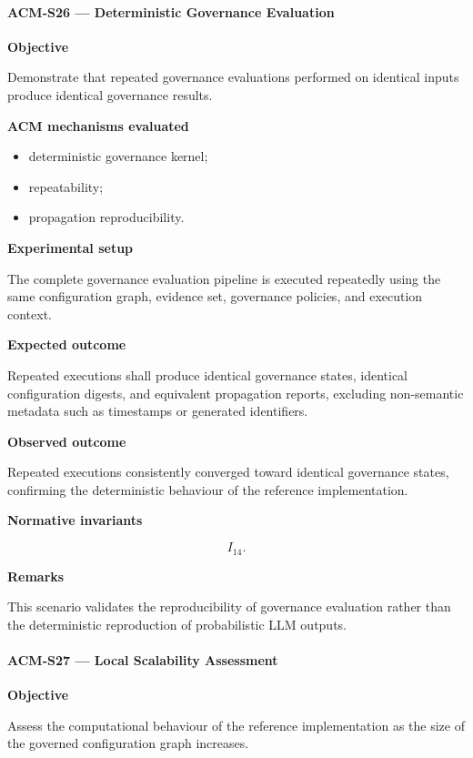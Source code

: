 \documentclass[10pt]{article}
\begin{document}
\paragraph{ACM-S26 --- Deterministic Governance Evaluation}

\textbf{Objective}

Demonstrate that repeated governance evaluations performed on identical inputs
produce identical governance results.

\textbf{ACM mechanisms evaluated}

\begin{itemize}
    \item deterministic governance kernel;
    \item repeatability;
    \item propagation reproducibility.
\end{itemize}

\textbf{Experimental setup}

The complete governance evaluation pipeline is executed repeatedly using the
same configuration graph, evidence set, governance policies, and execution
context.

\textbf{Expected outcome}

Repeated executions shall produce identical governance states, identical
configuration digests, and equivalent propagation reports, excluding
non-semantic metadata such as timestamps or generated identifiers.

\textbf{Observed outcome}

Repeated executions consistently converged toward identical governance states,
confirming the deterministic behaviour of the reference implementation.

\textbf{Normative invariants}

\[
I_{14}.
\]

\textbf{Remarks}

This scenario validates the reproducibility of governance evaluation rather
than the deterministic reproduction of probabilistic LLM outputs.

\paragraph{ACM-S27 --- Local Scalability Assessment}

\textbf{Objective}

Assess the computational behaviour of the reference implementation as the size
of the governed configuration graph increases.
\end{document}
